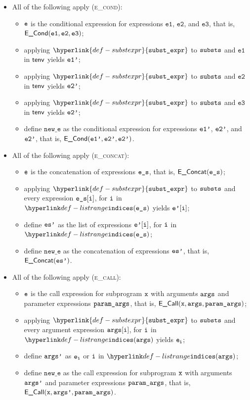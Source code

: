 \documentclass{book}
\newcommand\substexpr[0]{\hyperlink{def-substexpr}{\texttt{subst\_expr}}}
\newcommand\veone[0]{\texttt{e1}}
\newcommand\vetwo[0]{\texttt{e2}}
\newcommand\vethree[0]{\texttt{e3}}
\newcommand\newe[0]{\texttt{new\_e}}
\newcommand\vep[0]{\texttt{e'}}
\begin{document}
\begin{itemize}
  \item All of the following apply (\textsc{e\_cond}):
  \begin{itemize}
    \item $\texttt{e}$ is the conditional expression for expressions $\veone$, $\vetwo$, and $\vethree$, that is, \\
          $\ECond(\veone, \vetwo, \vethree)$;
    \item applying $\substexpr$ to $\texttt{substs}$ and $\veone$ in $\textsf{tenv}$ yields $\texttt{e1'}$;
    \item applying $\substexpr$ to $\texttt{substs}$ and $\vetwo$ in $\textsf{tenv}$ yields $\texttt{e2'}$;
    \item applying $\substexpr$ to $\texttt{substs}$ and $\vethree$ in $\textsf{tenv}$ yields $\texttt{e2'}$;
    \item define $\newe$ as the conditional expression for expressions $\texttt{e1'}$, $\texttt{e2'}$, and $\texttt{e2'}$, that is, $\textsf{E\_Cond}(\texttt{e1'}, \texttt{e2'}, \texttt{e2'})$.
  \end{itemize}

  \item All of the following apply (\textsc{e\_concat}):
  \begin{itemize}
    \item $\texttt{e}$ is the concatenation of expressions $\texttt{e\_s}$, that is, $\textsf{E\_Concat}(\texttt{e\_s})$;
    \item applying $\substexpr$ to $\texttt{substs}$ and every expression $\texttt{e\_s}[\texttt{i}]$, for $\texttt{i}$ in \\
          $\listrange(\ves)$ yields $\vep[\vi]$;
    \item define $\texttt{es'}$ as the list of expressions $\vep[\vi]$, for $\texttt{i}$ in $\listrange(\ves)$;
    \item define $\newe$ as the concatenation of expressions $\texttt{es'}$, that is, $\textsf{E\_Concat}(\texttt{es'})$.
  \end{itemize}

  \item All of the following apply (\textsc{e\_call}):
  \begin{itemize}
    \item $\texttt{e}$ is the call expression for subprogram $\texttt{x}$ with arguments $\texttt{args}$ and parameter expressions $\texttt{param\_args}$,
          that is, $\textsf{E\_Call}(\texttt{x}, \texttt{args}, \texttt{param\_args})$;
    \item applying $\substexpr$ to $\texttt{substs}$ and every argument expression $\texttt{args}[\texttt{i}]$, for $\texttt{i}$ in \\
          $\listrange(\vargs)$ yields $\texttt{e}_{\texttt{i}}$;
    \item define $\texttt{args'}$ as $\texttt{e}_{\texttt{i}}$ or $\texttt{i}$ in $\listrange(\vargs)$;
    \item define $\newe$ as the call expression for subprogram $\texttt{x}$ with arguments $\texttt{args'}$ and parameter expressions $\texttt{param\_args}$,
    that is, $\textsf{E\_Call}(\texttt{x}, \texttt{args'}, \texttt{param\_args})$.
  \end{itemize}


\end{itemize}
\end{document}
